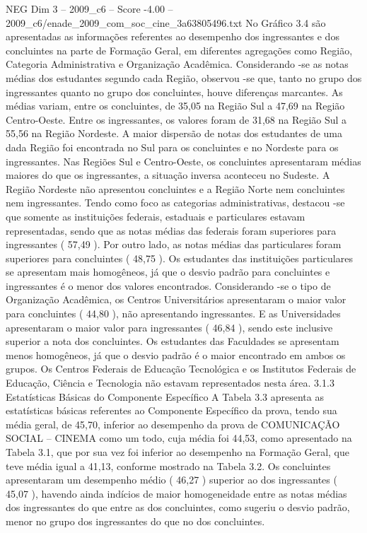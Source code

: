 \begin{textsample}{NEG Dim 3 – 2009\_c6 – Score -4.00 – 2009\_c6/enade\_2009\_com\_soc\_cine\_3a63805496.txt}
No Gráfico 3.4 são apresentadas as informações referentes ao desempenho dos ingressantes e dos concluintes na parte de Formação Geral, em diferentes agregações como Região, Categoria Administrativa e Organização Acadêmica.
Considerando -se as notas médias dos estudantes segundo cada Região, observou -se que, tanto no grupo dos ingressantes quanto no grupo dos concluintes, houve diferenças marcantes.
As médias variam, entre os concluintes, de 35,05 na Região Sul a 47,69 na Região Centro-Oeste.
Entre os ingressantes, os valores foram de 31,68 na Região Sul a 55,56 na Região Nordeste.
A maior dispersão de notas dos estudantes de uma dada Região foi encontrada no Sul para os concluintes e no Nordeste para os ingressantes.
Nas Regiões Sul e Centro-Oeste, os concluintes apresentaram médias maiores do que os ingressantes, a situação inversa aconteceu no Sudeste.
A Região Nordeste não apresentou concluintes e a Região Norte nem concluintes nem ingressantes.
Tendo como foco as categorias administrativas, destacou -se que somente as instituições federais, estaduais e particulares estavam representadas, sendo que as notas médias das federais foram superiores para ingressantes ( 57,49 ).
Por outro lado, as notas médias das particulares foram superiores para concluintes ( 48,75 ).
Os estudantes das instituições particulares se apresentam mais homogêneos, já que o desvio padrão para concluintes e ingressantes é o menor dos valores encontrados.
Considerando -se o tipo de Organização Acadêmica, os Centros Universitários apresentaram o maior valor para concluintes ( 44,80 ), não apresentando ingressantes.
E as Universidades apresentaram o maior valor para ingressantes ( 46,84 ), sendo este inclusive superior a nota dos concluintes.
Os estudantes das Faculdades se apresentam menos homogêneos, já que o desvio padrão é o maior encontrado em ambos os grupos.
Os Centros Federais de Educação Tecnológica e os Institutos Federais de Educação, Ciência e Tecnologia não estavam representados nesta área. 3.1.3 Estatísticas Básicas do Componente Específico A Tabela 3.3 apresenta as estatísticas básicas referentes ao Componente Específico da prova, tendo sua média geral, de 45,70, inferior ao desempenho da prova de COMUNICAÇÃO SOCIAL – CINEMA como um todo, cuja média foi 44,53, como apresentado na Tabela 3.1, que por sua vez foi inferior ao desempenho na Formação Geral, que teve média igual a 41,13, conforme mostrado na Tabela 3.2.
Os concluintes apresentaram um desempenho médio ( 46,27 ) superior ao dos ingressantes ( 45,07 ), havendo ainda indícios de maior homogeneidade entre as notas médias dos ingressantes do que entre as dos concluintes, como sugeriu o desvio padrão, menor no grupo dos ingressantes do que no dos concluintes.

\end{textsample}
